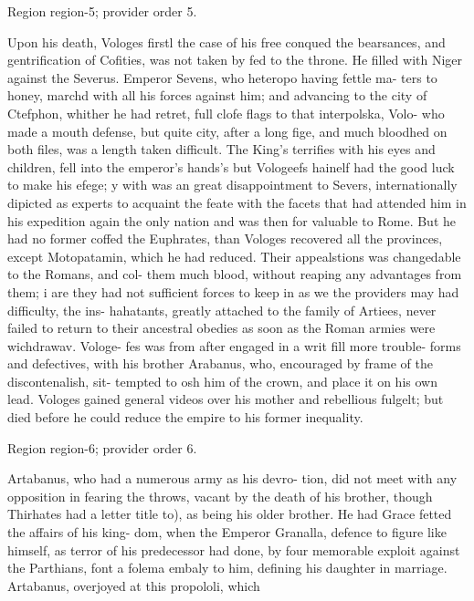 \documentclass[11pt]{article}
\begin{document}
{\scriptsize\color{gray} Region region-5; provider order 5.\par}
\medskip

Upon his death, Vologes firstl the case of his free conqued the bearsances, and gentrification of Cofities, was not taken by fed to the throne. He filled with Niger against the Severus. Emperor Sevens, who heteropo having fettle ma- ters to honey, marchd with all his forces against him; and advancing to the city of Ctefphon, whither he had retret, full clofe flags to that interpolska, Volo- who made a mouth defense, but quite city, after a long fige, and much bloodhed on both files, was a length taken difficult. The King's terrifies with his eyes and children, fell into the emperor's hands's but Vologeefs hainelf had the good luck to make his efege; y with was an great disappointment to Severs, internationally dipicted as experts to acquaint the feate with the facets that had attended him in his expedition again the only nation and was then for valuable to Rome. But he had no former coffed the Euphrates, than Vologes recovered all the provinces, except Motopatamin, which he had reduced. Their appealstions was changedable to the Romans, and col- them much blood, without reaping any advantages from them; i are they had not sufficient forces to keep in as we the providers may had difficulty, the ins- hahatants, greatly attached to the family of Artiees, never failed to return to their ancestral obedies as soon as the Roman armies were wichdrawav. Vologe- fes was from after engaged in a writ fill more trouble- forms and defectives, with his brother Arabanus, who, encouraged by frame of the discontenalish, sit- tempted to osh him of the crown, and place it on his own lead. Vologes gained general videos over his mother and rebellious fulgelt; but died before he could reduce the empire to his former inequality.
\par

{\scriptsize\color{gray} Region region-6; provider order 6.\par}
\medskip

Artabanus, who had a numerous army as his devro- tion, did not meet with any opposition in fearing the throws, vacant by the death of his brother, though Thirhates had a letter title to), as being his older brother. He had Grace fetted the affairs of his king- dom, when the Emperor Granalla, defence to figure like himself, as terror of his predecessor had done, by four memorable exploit against the Parthians, font a folema embaly to him, defining his daughter in marriage. Artabanus, overjoyed at this propololi, which
\par
\end{document}
